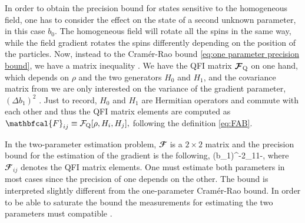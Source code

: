 In order to obtain the precision bound for states sensitive to the
homogeneous field, one has to consider the effect on the state of a second
unknown parameter, in this case $b_0$.
The homogeneous field will rotate all the spins in the same way,
while the field gradient rotates the spins
differently depending on the position of the particles.
Now, instead to the Cram\'er-Rao bound  \eqref{eq:one parameter precision bound},
we have a matrix inequality \citep{Paris2009}.
We have the QFI matrix $\boldsymbol{\mathcal{F}}_{\text{Q}}$ on one hand, which depends on $\rho$ and the two generators $H_0$ and $H_1$, and the covariance matrix from we are only interested on the variance of the gradient parameter, $(\Delta b_1)^2$ \citep{Paris2009}.
Just to record, $H_0$ and $H_1$ are Hermitian operators and commute with each other and thus the QFI matrix elements are computed as $\mathbfcal{F}_{ij}\equiv \qfi[\rho, H_i, H_j],$ following the definition \eqref{eq:FAB}.

In the two-parameter estimation problem, ${\mathbfcal{F}}$ is a $2 \times 2$ matrix and the precision bound for the estimation of the gradient is the following,
\be
\label{eq:precision bound for b1 in terms of QFI matrix elements}
(\Delta b_1)^{-2}\leq {}_{11}-,
\ee
where $\mathbfcal{F}_{ij}$ denotes the QFI matrix elements.
One must estimate both parameters in most cases since the precision of one depends on the other.
The bound is interpreted slightly different from the one-parameter Cram\'er-Rao bound.
In order to be able to saturate the bound the measurements for estimating the two parameters must compatible \citep{Paris2009}.


